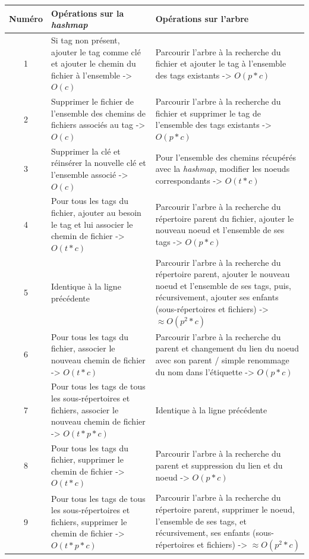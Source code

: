 \begin{center}
    \begin{tabularx}{16cm}{|c|p{6cm}|X|} \hline
        \textbf{Numéro} & \textbf{Opérations sur la \textit{hashmap}} & \textbf{Opérations sur l'arbre} \\ \hline
        1 & Si tag non présent, ajouter le tag comme clé et 
            ajouter le chemin du fichier à l'ensemble -> $O(c)$ & Parcourir l'arbre à la recherche 
            du fichier et ajouter le tag à l'ensemble des tags existants -> $O(p * c)$ \\ \hline
        2 & Supprimer le fichier de l'ensemble des 
            chemins de fichiers associés au tag -> $O(c)$ & Parcourir l'arbre à la recherche 
            du fichier et supprimer le tag de l'ensemble des tags existants -> $O(p * c)$ \\ \hline
        3 & Supprimer la clé et réinsérer la nouvelle clé et l'ensemble associé -> $O(c)$ & Pour l'ensemble 
            des chemins récupérés avec la \textit{hashmap}, modifier les noeuds correspondants -> $O(t * c)$ \\ \hline
        4 & Pour tous les tags du fichier, ajouter au besoin le tag et lui 
            associer le chemin de fichier -> $O(t * c)$ & Parcourir l'arbre à 
            la recherche du répertoire parent du fichier, ajouter le nouveau noeud et l'ensemble 
            de ses tags -> $O(p * c)$ \\ \hline
        5 & Identique à la ligne précédente & Parcourir l'arbre à 
            la recherche du répertoire parent, ajouter le nouveau noeud et l'ensemble 
            de ses tags, puis, récursivement, ajouter ses enfants (sous-répertoires et fichiers) 
            -> $\approx O(p^2 * c)$ \\ \hline
        6 & Pour tous les tags du fichier, associer le nouveau 
            chemin de fichier -> $O(t * c)$ & Parcourir l'arbre à la recherche du parent et 
            changement du lien du noeud avec son parent / simple renommage du nom dans 
            l'étiquette -> $O(p * c)$ \\ \hline
        7 & Pour tous les tags de tous les 
            sous-répertoires et fichiers, associer le nouveau chemin de fichier -> $O(t * p * c)$ 
            & Identique à la ligne précédente \\ \hline
        8 & Pour tous les tags du fichier, supprimer le chemin de fichier 
            -> $O(t * c)$ & Parcourir l'arbre à la recherche du parent et suppression du lien et 
            du noeud -> $O(p * c)$ \\ \hline
        9 & Pour tous les tags de tous les sous-répertoires et fichiers, 
            supprimer le chemin de fichier -> $O(t * p * c)$ & Parcourir l'arbre à la recherche du 
            répertoire parent, supprimer le noeud, l'ensemble de ses tags, et récursivement, ses 
            enfants (sous-répertoires et fichiers) -> $\approx O(p^2 * c)$ \\ \hline
    \end{tabularx}
    \label{table_architecture_1}
\end{center}


